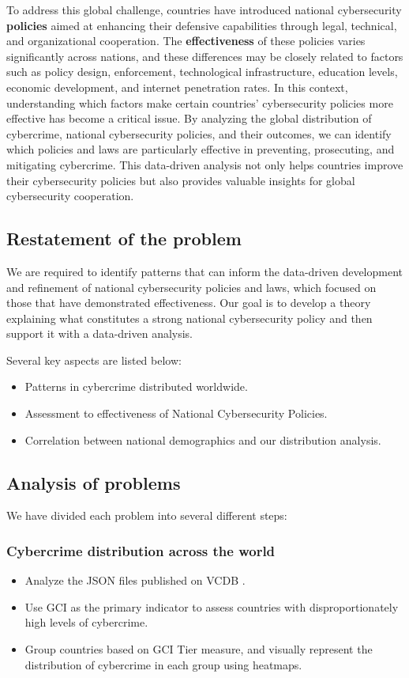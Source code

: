 \documentclass[12pt]{article}
\begin{document}
		To address this global challenge, countries have introduced national cybersecurity \textbf{policies}
		aimed at enhancing their defensive capabilities through legal, technical, and organizational cooperation.
		The \textbf{effectiveness} of these policies varies significantly across nations, and these differences may be closely related to factors
		such as policy design, enforcement, technological infrastructure, education levels, economic development, and internet penetration rates.
		In this context, understanding which factors make certain countries' cybersecurity policies more effective has become a critical issue.
		By analyzing the global distribution of cybercrime, national cybersecurity policies, and their outcomes,
		we can identify which policies and laws are particularly effective in preventing, prosecuting, and mitigating cybercrime.
		This data-driven analysis not only helps countries improve their cybersecurity policies
		but also provides valuable insights for global cybersecurity cooperation.
	\subsection{Restatement of the problem}\label{subsec:restatement-of-the-problem} %
		We are required to identify patterns that can inform the data-driven development and refinement of national cybersecurity policies and laws,
		which focused on those that have demonstrated effectiveness.
		Our goal is to develop a theory explaining what constitutes a strong national cybersecurity policy and then support it with a data-driven analysis.

		Several key aspects are listed below:
		\begin{itemize}
			\item Patterns in cybercrime distributed worldwide.
			\item Assessment to effectiveness of National Cybersecurity Policies.
			\item Correlation between national demographics and our distribution analysis.
		\end{itemize}
	\subsection{Analysis of problems}\label{subsec:analysis-of-problems} %
		We have divided each problem into several different steps:
		\subsubsection[]{Cybercrime distribution across the world} %
			\begin{itemize}
				\item Analyze the JSON files published on VCDB .
				\item Use GCI as the primary indicator to assess countries with disproportionately high levels of cybercrime.
				\item Group countries based on GCI Tier measure, and
					visually represent the distribution of cybercrime in each group using heatmaps.
			\end{itemize}
\end{document}
